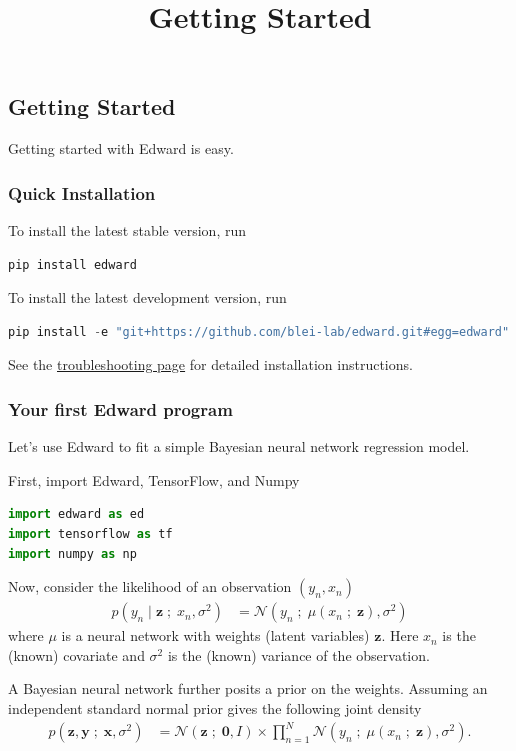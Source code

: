\title{Getting Started}

\subsection{Getting Started}
Getting started with Edward is easy. 

\subsubsection{Quick Installation}
To install the latest stable version, run

\begin{lstlisting}[language=Java]
pip install edward
\end{lstlisting}

To install the latest development version, run

\begin{lstlisting}[language=Java]
pip install -e "git+https://github.com/blei-lab/edward.git#egg=edward"
\end{lstlisting}

See the \href{troubleshooting.html}{troubleshooting page} for detailed
installation instructions.


\subsubsection{Your first Edward program}

Let's use Edward to fit a simple Bayesian neural network regression model.

First, import Edward, TensorFlow, and Numpy
\begin{lstlisting}[language=Python]
import edward as ed
import tensorflow as tf
import numpy as np  
\end{lstlisting}

Now, consider the likelihood of an observation $(y_n, x_n)$
\begin{align*}
  p(y_n \mid \mathbf{z} \;;\; x_n, \sigma^2)
  &=
  \mathcal{N}(y_n \;;\; \mu(x_n\;;\;\mathbf{z}), \sigma^2)
\end{align*} 
where $\mu$ is a neural network with weights (latent variables) 
$\mathbf{z}$. Here $x_n$ is the (known) covariate and $\sigma^2$ is the
(known) variance of the observation.

A Bayesian neural network further posits a prior on the weights. Assuming an
independent standard normal prior gives the following joint density
\begin{align*}
  p(\mathbf{z}, \mathbf{y} \;;\; \mathbf{x}, \sigma^2)
  &=
  \mathcal{N}(\mathbf{z} \;;\; \mathbf{0}, I)
  \times
  \prod_{n=1}^N
  \mathcal{N}(y_n \;;\; \mu(x_n\;;\;\mathbf{z}), \sigma^2).
\end{align*}

